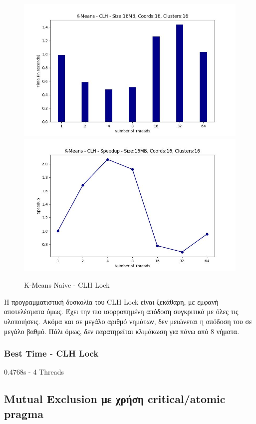 \documentclass[../final_report.tex]{subfiles}
\begin{document}
\begin{figure}[H]
    \centering
        \includegraphics[scale=0.4]{outFilesCores/plots/kmeans_locks_clh.jpg}
        \includegraphics[scale=0.4]{outFilesCores/plots/kmeans_locks_clh_speedup.jpg}
    \caption{K-Means Naive - CLH Lock}
    \label{fig:K-Means Naive - CLH Lock}
\end{figure}

Η προγραμματιστική δυσκολία του CLH Lock είναι ξεκάθαρη, με εμφανή αποτελέσματα όμως. Έχει την πιο
ισορροπημένη απόδοση συγκριτικά με όλες τις υλοποιήσεις. Ακόμα και σε μεγάλο αριθμό νημάτων, δεν μειώνεται η 
απόδοση του σε μεγάλο βαθμό. Πάλι όμως, δεν παρατηρείται κλιμάκωση για πάνω από 8 νήματα. 

\subsubsection*{Best Time - CLH Lock}
0.4768s - 4 Threads

\subsection{Mutual Exclusion με χρήση critical/atomic pragma}
\end{document}
